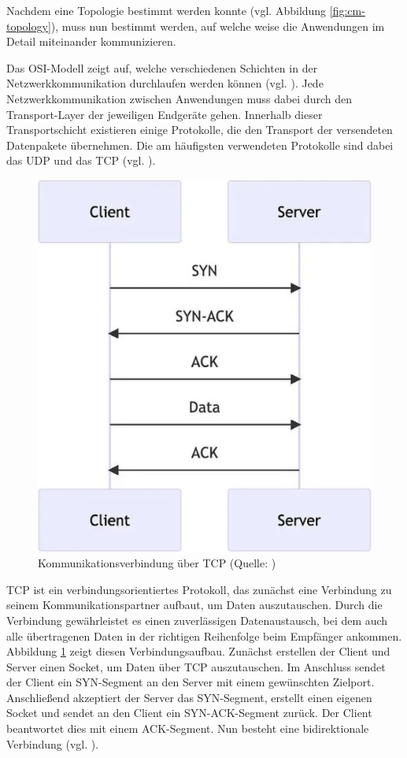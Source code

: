 Nachdem eine Topologie bestimmt werden konnte (vgl. Abbildung \ref{fig:cm-topology}), muss nun bestimmt werden, auf welche weise die Anwendungen im Detail miteinander kommunizieren. 

Das \ac{OSI}-Modell zeigt auf, welche verschiedenen Schichten in der Netzwerkkommunikation durchlaufen werden können (vgl. \cite{noauthor_osi-modell_nodate}). Jede Netzwerkkommunikation zwischen Anwendungen muss dabei durch den Transport-Layer der jeweiligen Endgeräte gehen. Innerhalb dieser Transportschicht existieren einige Protokolle, die den Transport der versendeten Datenpakete übernehmen. Die am häufigsten verwendeten Protokolle sind dabei das \ac{UDP} und das \ac{TCP} (vgl. \cite{noauthor_transport_nodate}). 

\begin{figure}[ht]
\centering
\includegraphics[width=0.5\linewidth]{content/pictures/TCP-Network.png}
\caption{Kommunikationsverbindung über TCP (Quelle: \cite{mygames_unity_2024})}
\label{fig:tcp}
\end{figure}

\ac{TCP} ist ein verbindungsorientiertes Protokoll, das zunächst eine Verbindung zu seinem Kommunikationspartner aufbaut, um Daten auszutauschen. Durch die Verbindung gewährleistet es einen zuverlässigen Datenaustausch, bei dem auch alle übertragenen Daten in der richtigen Reihenfolge beim Empfänger ankommen. Abbildung \ref{fig:tcp} zeigt diesen Verbindungsaufbau.
Zunächst erstellen der Client und Server einen Socket, um Daten über \ac{TCP} auszutauschen. Im Anschluss sendet der Client ein \ac{SYN}-Segment an den Server mit einem gewünschten Zielport. Anschließend akzeptiert der Server das \ac{SYN}-Segment, erstellt einen eigenen Socket und sendet an den Client ein \ac{SYN}-\ac{ACK}-Segment zurück. Der Client beantwortet dies mit einem \ac{ACK}-Segment. Nun besteht eine bidirektionale Verbindung  (vgl. \cite{mygames_unity_2024}).

